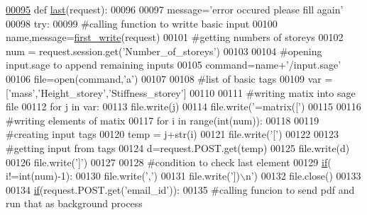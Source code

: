\begin{DoxyCode}
\hypertarget{namespacecivilsage_1_1views_l00095}{}\hyperlink{namespacecivilsage_1_1views_aed47fb0740a2fa14693f697905788719}{00095} \textcolor{keyword}{def }\hyperlink{namespacecivilsage_1_1views_aed47fb0740a2fa14693f697905788719}{last}(request):
00096 
00097     message=\textcolor{stringliteral}{'error occured please fill again'}
00098     \textcolor{keywordflow}{try}:
00099         \textcolor{comment}{#calling function to writte basic input}
00100         name,message=\hyperlink{namespacecivilsage_1_1views_ad9397359f36a9df37e0aa43f3be032a3}{first\_write}(request)
00101         \textcolor{comment}{#getting numbers of storeys}
00102         num = request.session.get(\textcolor{stringliteral}{'Number\_of\_storeys'})
00103 
00104         \textcolor{comment}{#opening input.sage to append remaining inputs}
00105         command=name+\textcolor{stringliteral}{'/input.sage'}
00106         file=open(command,\textcolor{stringliteral}{'a'})
00107 
00108         \textcolor{comment}{#list of basic tags}
00109         var = [\textcolor{stringliteral}{'mass'},\textcolor{stringliteral}{'Height\_storey'},\textcolor{stringliteral}{'Stiffness\_storey'}]
00110 
00111         \textcolor{comment}{#writing matix into sage file}
00112         \textcolor{keywordflow}{for} j \textcolor{keywordflow}{in} var:
00113             file.write(j)
00114             file.write(\textcolor{stringliteral}{'=matrix(['})
00115 
00116             \textcolor{comment}{#writing elements of matix}
00117             \textcolor{keywordflow}{for} i \textcolor{keywordflow}{in} range(int(num)):
00118 
00119                 \textcolor{comment}{#creating input tags}
00120                 temp = j+str(i)
00121                 file.write(\textcolor{stringliteral}{'['})
00122 
00123                 \textcolor{comment}{#getting input from tags}
00124                 d=request.POST.get(temp)
00125                 file.write(d)
00126                 file.write(\textcolor{stringliteral}{']'})
00127 
00128                 \textcolor{comment}{#condition to check last element}
00129                 \hyperlink{bootstrap_8min_8js_ac2d69f5011896c6ed4a54e0dd36f6334}{if}( i!=int(num)-1):
00130                     file.write(\textcolor{stringliteral}{','})
00131             file.write(\textcolor{stringliteral}{'])\(\backslash\)n'})
00132         file.close()
00133 
00134         \hyperlink{bootstrap_8min_8js_ac2d69f5011896c6ed4a54e0dd36f6334}{if}(request.POST.get(\textcolor{stringliteral}{'email\_id'})):
00135             \textcolor{comment}{#calling funcion to send pdf and run that as background process}

\end{DoxyCode}
